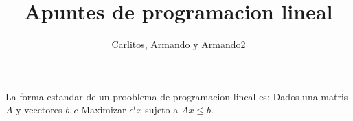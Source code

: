 \documentclass{article}
\title{Apuntes de programacion lineal}
\author{Carlitos, Armando y Armando2}
\begin{document}
\maketitle
La forma estandar de un prooblema de
programacion lineal es:
Dados una matris $A$ y veectores $b,c$ Maximizar $c^tx$ sujeto a
$Ax\leq b$.
\end{document}
